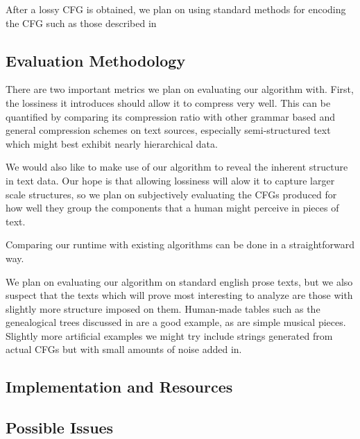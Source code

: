 \documentclass[11pt]{article}
\begin{document}
After a lossy CFG is obtained, we plan on using standard methods for encoding
the CFG such as those described in \cite{sequitur2}

\subsection{Evaluation Methodology}

There are two important metrics we plan on evaluating our algorithm with.
First, the lossiness it introduces should allow it to compress very well. This
can be quantified by comparing its compression ratio with other grammar based
and general compression schemes on text sources, especially semi-structured
text which might best exhibit nearly hierarchical data.

We would also like to make use of our algorithm to reveal the inherent
structure in text data. Our hope is that allowing lossiness will alow it to
capture larger scale structures, so we plan on subjectively evaluating the CFGs
produced for how well they group the components that a human might perceive in
pieces of text.

Comparing our runtime with existing algorithms can be done in a straightforward
way.

We plan on evaluating our algorithm on standard english prose texts, but we
also suspect that the texts which will prove most interesting to analyze are
those with slightly more structure imposed on them. Human-made tables such as
the genealogical trees discussed in \cite{nevillphd} are a good example, as are
simple musical pieces. Slightly more artificial examples we might try include
strings generated from actual CFGs but with small amounts of noise added in.

\subsection{Implementation and Resources}

\subsection{Possible Issues}

\nocite{*}


\end{document}
